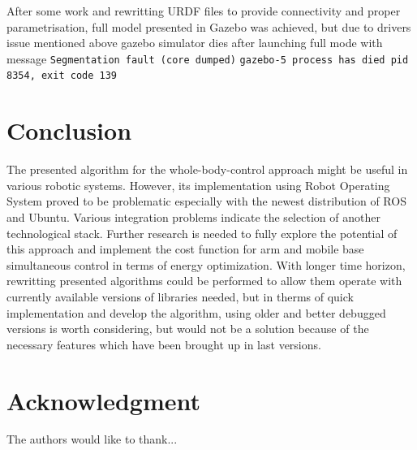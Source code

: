\documentclass[conference,a4paper]{IEEEtran}
\begin{document}
After some work and rewritting URDF files to provide connectivity and proper parametrisation, full model presented in Gazebo was achieved, but due to drivers issue mentioned above
gazebo simulator dies after launching full mode with message \break \texttt{Segmentation fault (core dumped)} \break
\texttt{gazebo-5 process has died pid 8354, exit code 139}

\section{Conclusion}
The presented algorithm for the whole-body-control approach might be useful in various robotic systems. However, its implementation using Robot Operating System proved to be problematic especially with the newest distribution of ROS and Ubuntu. 
Various integration problems indicate the selection of another technological stack. Further research is needed to fully explore the potential of this approach and implement the cost function for arm and mobile base simultaneous control in terms of energy optimization.
With longer time horizon, rewritting presented algorithms could be performed to allow them operate with currently available versions of libraries needed, but in therms of quick implementation and develop the algorithm, using older and better debugged versions is worth considering, but would not be a solution because of the necessary features which have been brought up in last versions. 
\section*{Acknowledgment}


The authors would like to thank...



\end{document}

